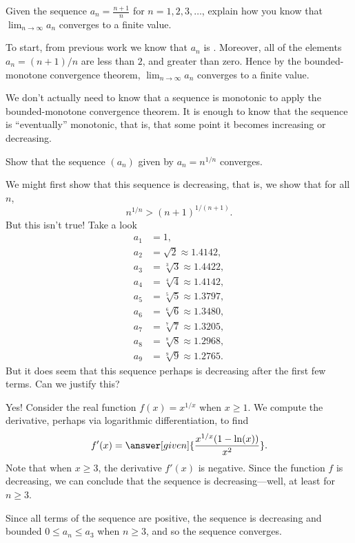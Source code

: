 \documentclass{ximera}
\begin{document}
\begin{example}
  Given the sequence $a_n=\frac{n+1}{n}$ for $n=1,2,3,\dots$,
  explain how you know that $\lim_{n\to\infty} a_n$ converges to a
  finite value.
  \begin{explanation}
    To start, from previous work we know that $a_n$ is
    .
    Moreover, all of the elements $a_n = (n+1)/n$ are less than $2$,
    and greater than zero. Hence by the bounded-monotone convergence
    theorem, $\lim_{n\to\infty} a_n$ converges to a finite value.
  \end{explanation}
\end{example}

\begin{remark}
We don't actually need to know that a sequence is monotonic to apply
the bounded-monotone convergence theorem. It is enough to know that
the sequence is ``eventually'' monotonic, that is, that some point it
becomes increasing or decreasing.
\end{remark}

\begin{example}
Show that the sequence $(a_n)$ given by $a_n = n^{1/n}$ converges.
\begin{explanation}
  We might first show that this sequence is decreasing, that is, we show
  that for all $n$,
  \[
  n^{1/n} > (n+1)^{1/(n+1)}.
  \]
  But this isn't true!  Take a look
  \begin{align*}
    a_1 &= 1, \\
    a_2 &= \sqrt{2} \approx 1.4142, \\
    a_3 &= \sqrt[3]{3} \approx 1.4422, \\
    a_4 &= \sqrt[4]{4} \approx 1.4142, \\
    a_5 &= \sqrt[5]{5} \approx 1.3797, \\
    a_6 &= \sqrt[6]{6} \approx 1.3480, \\
    a_7 &= \sqrt[7]{7} \approx 1.3205, \\
    a_8 &= \sqrt[8]{8} \approx 1.2968, \\
    a_9 &= \sqrt[9]{9} \approx 1.2765.
  \end{align*}
  But it does seem that this sequence perhaps is decreasing after the
  first few terms.  Can we justify this?

  Yes!  Consider the real function $f(x)=x^{1/x}$ when $x\ge 1$.  We
  compute the derivative, perhaps via logarithmic differentiation, to find
  \[
  f'(x)=\answer[given]{\frac{x^{1/x} (1-\ln(x))}{x^2}}.
  \]
  Note that when $x\ge 3$, the derivative $f'(x)$ is negative.  Since
  the function $f$ is decreasing, we can conclude that the sequence is
  decreasing---well, at least for $n \geq 3$.

  Since all terms of the sequence are positive, the sequence is
  decreasing and bounded $0\le a_n \le a_3$ when $n \ge 3$, and so the
  sequence converges.
\end{explanation}
\end{example}
\end{document}
